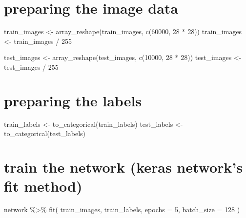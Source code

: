 \documentclass[]{article}
\newenvironment{Shaded}{\begin{snugshade}}{\end{snugshade}}
\newcommand{\AttributeTok}[1]{\textcolor[rgb]{0.77,0.63,0.00}{#1}}
\newcommand{\DecValTok}[1]{\textcolor[rgb]{0.00,0.00,0.81}{#1}}
\newcommand{\FunctionTok}[1]{\textcolor[rgb]{0.00,0.00,0.00}{#1}}
\newcommand{\NormalTok}[1]{#1}
\newcommand{\OtherTok}[1]{\textcolor[rgb]{0.56,0.35,0.01}{#1}}
\newcommand{\SpecialCharTok}[1]{\textcolor[rgb]{0.00,0.00,0.00}{#1}}
\begin{document}
\hypertarget{preparing-the-image-data}{%
\section{preparing the image data}\label{preparing-the-image-data}}

\begin{Shaded}
\begin{Highlighting}[]
\NormalTok{train\_images }\OtherTok{\textless{}{-}} \FunctionTok{array\_reshape}\NormalTok{(train\_images, }\FunctionTok{c}\NormalTok{(}\DecValTok{60000}\NormalTok{, }\DecValTok{28} \SpecialCharTok{*} \DecValTok{28}\NormalTok{))}
\NormalTok{train\_images }\OtherTok{\textless{}{-}}\NormalTok{ train\_images }\SpecialCharTok{/} \DecValTok{255}

\NormalTok{test\_images }\OtherTok{\textless{}{-}} \FunctionTok{array\_reshape}\NormalTok{(test\_images, }\FunctionTok{c}\NormalTok{(}\DecValTok{10000}\NormalTok{, }\DecValTok{28} \SpecialCharTok{*} \DecValTok{28}\NormalTok{))}
\NormalTok{test\_images }\OtherTok{\textless{}{-}}\NormalTok{ test\_images }\SpecialCharTok{/} \DecValTok{255}
\end{Highlighting}
\end{Shaded}

\hypertarget{preparing-the-labels}{%
\section{preparing the labels}\label{preparing-the-labels}}

\begin{Shaded}
\begin{Highlighting}[]
\NormalTok{train\_labels }\OtherTok{\textless{}{-}} \FunctionTok{to\_categorical}\NormalTok{(train\_labels)}
\NormalTok{test\_labels }\OtherTok{\textless{}{-}} \FunctionTok{to\_categorical}\NormalTok{(test\_labels)}
\end{Highlighting}
\end{Shaded}

\hypertarget{train-the-network-keras-networks-fit-method}{%
\section{train the network (keras network's fit
method)}\label{train-the-network-keras-networks-fit-method}}

\begin{Shaded}
\begin{Highlighting}[]
\NormalTok{network }\SpecialCharTok{\%\textgreater{}\%} \FunctionTok{fit}\NormalTok{(}
\NormalTok{  train\_images,}
\NormalTok{  train\_labels,}
  \AttributeTok{epochs =} \DecValTok{5}\NormalTok{, }
  \AttributeTok{batch\_size =} \DecValTok{128}
\NormalTok{)}
\end{Highlighting}
\end{Shaded}
\end{document}
